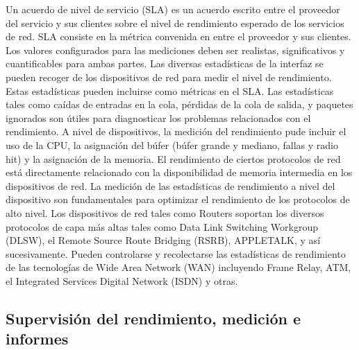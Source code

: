 \noindent
Un acuerdo de nivel de servicio (SLA) es un acuerdo escrito entre el proveedor del servicio y sus clientes sobre el nivel de rendimiento esperado de los servicios de red. SLA consiste en la métrica convenida en entre el proveedor y sus clientes. Los valores configurados para las mediciones deben ser realistas, significativos y cuantificables para ambas partes.
\newline
\newline
Las diversas estadísticas de la interfaz se pueden recoger de los dispositivos de red para medir el nivel de rendimiento. Estas estadísticas pueden incluirse como métricas en el SLA. Las estadísticas tales como caídas de entradas en la cola, pérdidas de la cola de salida, y paquetes ignorados son útiles para diagnosticar los problemas relacionados con el rendimiento.
\newline
\newline
A nivel de dispositivos, la medición del rendimiento pude incluir el uso de la CPU, la asignación del búfer (búfer grande y mediano, fallas y radio hit) y la asignación de la memoria. El rendimiento de ciertos protocolos de red está directamente relacionado con la disponibilidad de memoria intermedia en los dispositivos de red. La medición de las estadísticas de rendimiento a nivel del dispositivo son fundamentales para optimizar el rendimiento de los protocolos de alto nivel.
\newline
\newline
Los dispositivos de red tales como Routers soportan los diversos protocolos de capa más altas tales como Data Link Switching Workgroup (DLSW), el Remote Source Route Bridging (RSRB), APPLETALK, y así sucesivamente. Pueden controlarse y recolectarse las estadísticas de rendimiento de las tecnologías de Wide Area Network (WAN) incluyendo Frame Relay, ATM, el Integrated Services Digital Network (ISDN) y otras. \cite{admin_redCisco}
\newline

\subsection{Supervisión del rendimiento, medición e informes}

